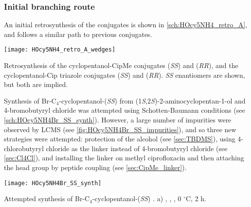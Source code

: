 \subsubsection{Initial branching route\label{sec:init_branch}}

An initial retrosynthesis of the conjugates is shown in \ref{sch:HOcy5NH4_retro_A}, and follows a similar path to previous conjugates.

\begin{scheme}[H]
	\begin{center}
		\texttt{[image: HOcy5NH4\_retro\_A\_wedges]}
		\caption{Retrosynthesis of the cyclopentanol-CipMe conjugates 
		 (\textit{SS}) and 
		 (\textit{RR}),
		and the cyclopentanol-Cip triazole conjugates 
		 (\textit{SS}) and   (\textit{RR}). 
		\textit{SS} enantiomers are shown, but both are implied. \label{sch:HOcy5NH4_retro_A}}
	\end{center}
\end{scheme}

Synthesis of Br-C$_4$-cyclopentanol-(\textit{SS})  from (1\textit{S},2\textit{S})-2-aminocyclopentan-1-ol  and 4-bromobutyryl chloride  was attempted using Schotten-Baumann conditions (see \ref{sch:HOcy5NH4Br_SS_synth}). However, a large number of impurities were observed by LCMS (see \ref{fig:HOcy5NH4Br_SS_impurities}), and so three new strategies were attempted: protection of the alcohol (see \ref{sec:TBDMS}), using 4-chlorobutyryl chloride  as the linker instead of 4-bromobutyryl chloride  (see \ref{sec:Cl4Cl}), and  installing the linker on methyl ciprofloxacin  and then attaching the head group by peptide coupling (see \ref{sec:CipMe_linker}).


\begin{scheme}[H]
	\begin{center}
		\texttt{[image: HOcy5NH4Br\_SS\_synth]}
		\caption{Attempted synthesis of Br-C$_4$-cyclopentanol-(\textit{SS}) .
		a) , , , 0 $^{\circ}$C, 2 h. \label{sch:HOcy5NH4Br_SS_synth}}
	\end{center}
\end{scheme}

